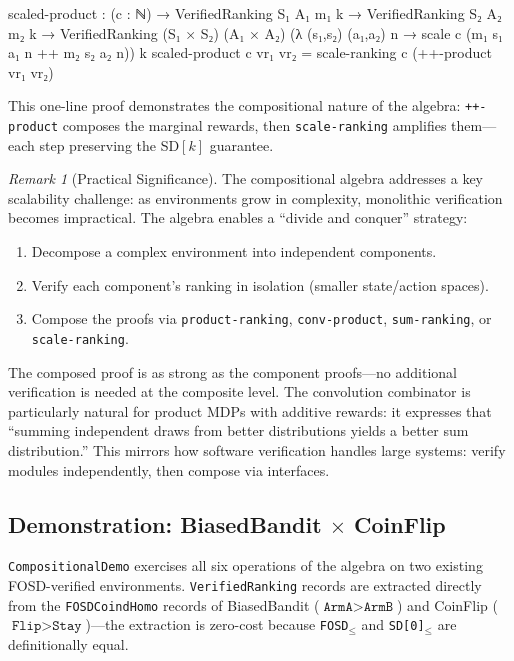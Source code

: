 \documentclass[9pt,a4paper]{article}
\theoremstyle{plain}
\theoremstyle{definition}
\theoremstyle{remark}
\newtheorem{remark}{Remark}
\begin{document}
\begin{spec}
  scaled-product : (c : ℕ) →
    VerifiedRanking S₁ A₁ m₁ k → VerifiedRanking S₂ A₂ m₂ k →
    VerifiedRanking (S₁ × S₂) (A₁ × A₂)
      (λ (s₁,s₂) (a₁,a₂) n → scale c (m₁ s₁ a₁ n ++ m₂ s₂ a₂ n)) k
  scaled-product c vr₁ vr₂ = scale-ranking c (++-product vr₁ vr₂)
\end{spec}

\noindent This one-line proof demonstrates the compositional nature of the algebra: \texttt{++-product} composes the marginal rewards, then \texttt{scale-ranking} amplifies them---each step preserving the SD$[k]$ guarantee.

\begin{remark}[Practical Significance]
The compositional algebra addresses a key scalability challenge: as environments grow in complexity, monolithic verification becomes impractical.  The algebra enables a ``divide and conquer'' strategy:
\begin{enumerate}
\item Decompose a complex environment into independent components.
\item Verify each component's ranking in isolation (smaller state/action spaces).
\item Compose the proofs via \texttt{product-ranking}, \texttt{conv-product}, \texttt{sum-ranking}, or \texttt{scale-ranking}.
\end{enumerate}
The composed proof is as strong as the component proofs---no additional verification is needed at the composite level.  The convolution combinator is particularly natural for product MDPs with additive rewards: it expresses that ``summing independent draws from better distributions yields a better sum distribution.''  This mirrors how software verification handles large systems: verify modules independently, then compose via interfaces.
\end{remark}

\subsection{Demonstration: BiasedBandit \texorpdfstring{$\times$}{x} CoinFlip}

\texttt{CompositionalDemo} exercises all six operations of the algebra on two existing FOSD-verified environments.  \texttt{VerifiedRanking} records are extracted directly from the \texttt{FOSDCoindHomo} records of BiasedBandit ($\texttt{ArmA} > \texttt{ArmB}$) and CoinFlip ($\texttt{Flip} > \texttt{Stay}$)---the extraction is zero-cost because \texttt{FOSD$_\le$} and \texttt{SD[0]$_\le$} are definitionally equal.
\end{document}

